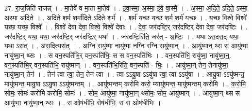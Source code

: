 \documentclass[17pt]{extarticle}
\begin{document}
27. रा॒ज॒न्निति॑ राजन्न् । . मा॒तेवे॑ व मा॒ता मा॒तेव॑ । . इ॒वा॒स्मा॒ अ॒स्मा॒ इ॒वे॒ वा॒स्मै॒ । . अ॒स्मा॒ अ॒दि॒ते॒ ऽदि॒ते॒ ऽस्मा॒ अ॒स्मा॒ अ॒दि॒ते॒ । . अ॒दि॒ते॒ शर्म॒ शर्मा॑दिते ऽदिते॒ शर्म॑ । . शर्म॑ यच्छ यच्छ॒ शर्म॒ शर्म॑ यच्छ । . य॒च्छ॒ विश्वे॒ विश्वे॑ यच्छ यच्छ॒ विश्वे᳚ । . विश्वे॑ देवा देवा॒ विश्वे॒ विश्वे॑ देवाः । . दे॒वा॒ जर॑दष्टि॒र् जर॑दष्टिर् देवा देवा॒ जर॑दष्टिः । . जर॑दष्टि॒र् यथा॒ यथा॒ जर॑दष्टि॒र् जर॑दष्टि॒र् यथा᳚ । . जर॑दष्टि॒रिति॒ जर॑त् - अ॒ष्टिः॒ । . यथा ऽस॒दस॒द् यथा॒ यथा ऽस॑त् । . अस॒दित्यस॑त् । . अ॒ग्नि रायु॑ष्मा॒ नायु॑ष्मा न॒ग्नि र॒ग्नि रायु॑ष्मान् । . आयु॑ष्मा॒न् थ्स स आयु॑ष्मा॒ नायु॑ष्मा॒न् थ्सः । . स वन॒स्पति॑भि॒र् वन॒स्पति॑भिः॒ स स वन॒स्पति॑भिः । . वन॒स्पति॑भि॒ रायु॑ष्मा॒ नायु॑ष्मा॒न्॒. वन॒स्पति॑भि॒र् वन॒स्पति॑भि॒ रायु॑ष्मान् । . वन॒स्पति॑भि॒रिति॒ वन॒स्पति॑ - भिः॒ । . आयु॑ष्मा॒न् तेन॒ तेनायु॑ष्मा॒ नायु॑ष्मा॒न् तेन॑ । . तेन॑ त्वा त्वा॒ तेन॒ तेन॑ त्वा । . त्वा ऽऽयु॒षा ऽऽयु॑षा त्वा॒ त्वा ऽऽयु॑षा । . आयु॒षा ऽऽयु॑ष्मन्त॒ मायु॑ष्मन्त॒ मायु॒षा ऽऽयु॒षा ऽऽयु॑ष्मन्तम् । . आयु॑ष्मन्तम् करोमि करो॒ म्यायु॑ष्मन्त॒ मायु॑ष्मन्तम् करोमि । . क॒रो॒मि॒ सोमः॒ सोमः॑ करोमि करोमि॒ सोमः॑ । . सोम॒ आयु॑ष्मा॒ नायु॑ष्मा॒न् थ्सोमः॒ सोम॒ आयु॑ष्मान् । . आयु॑ष्मा॒न् थ्स स आयु॑ष्मा॒ नायु॑ष्मा॒न् थ्सः । . स ओष॑धीभि॒ रोष॑धीभिः॒ स स ओष॑धीभिः । \newline
\end{document}
